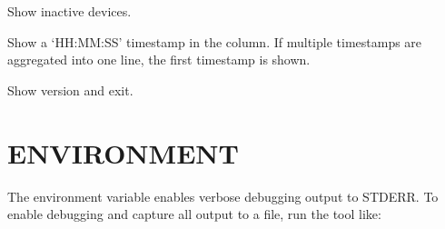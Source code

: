\documentclass[letterpaper,10pt,english]{sphinxmanual}
\begin{document}
\begin{fulllineitems}
\label{\detokenize{mariadb-iostat:cmdoption-mariadb-iostat-show-inactive}}
Show inactive devices.

\end{fulllineitems}


\begin{fulllineitems}
\label{\detokenize{mariadb-iostat:cmdoption-mariadb-iostat-show-timestamps}}
Show a ‘HH:MM:SS’ timestamp in the  column.  If multiple timestamps are
aggregated into one line, the first timestamp is shown.

\end{fulllineitems}


\begin{fulllineitems}
\label{\detokenize{mariadb-iostat:cmdoption-mariadb-iostat-version}}
Show version and exit.

\end{fulllineitems}



\section{ENVIRONMENT}
\label{\detokenize{mariadb-iostat:environment}}
The environment variable  enables verbose debugging output to STDERR.
To enable debugging and capture all output to a file, run the tool like:
\end{document}
